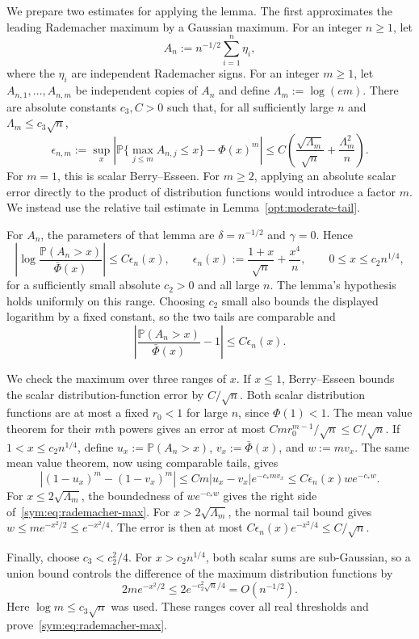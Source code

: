 \documentclass[11pt,letterpaper,twoside,leqno]{article}
\theoremstyle{bookplain}
\theoremstyle{bookremark}
\newcommand{\Pp}{\mathbb P}
\begin{document}
We prepare two estimates for applying the lemma. The first
approximates the leading Rademacher maximum by a Gaussian maximum.
For an integer $n\ge1$, let
\[
 A_n:=n^{-1/2}\sum_{i=1}^n\eta_i,
\]
where the $\eta_i$ are independent Rademacher signs. For an integer
$m\ge1$, let $A_{n,1},\ldots,A_{n,m}$ be independent copies
of $A_n$ and define $\Lambda_m:=\log(em)$. There are absolute
constants $c_3,C>0$ such that, for all sufficiently large $n$
and $\Lambda_m\le c_3\sqrt n$,
\begin{equation}
 \epsilon_{n,m}:=\sup_x\left|\Pp\{\max_{j\le m}A_{n,j}\le x\}
                         -\Phi(x)^m\right|
 \le C\left(\frac{\sqrt{\Lambda_m}}{\sqrt n}
                 +\frac{\Lambda_m^2}{n}\right).
 \label{sym:eq:rademacher-max}
\end{equation}
For $m=1$, this is scalar Berry--Esseen. For $m\ge2$, applying
an absolute scalar error directly to the product of distribution
functions would introduce a factor $m$. We instead use the
relative tail estimate in Lemma~\ref{opt:moderate-tail}.

For $A_n$, the parameters of that lemma are $\delta=n^{-1/2}$
and $\gamma=0$. Hence
\[
 \left|\log\frac{\Pp(A_n>x)}{\bar\Phi(x)}\right|
 \le C\epsilon_n(x),\qquad
 \epsilon_n(x):=\frac{1+x}{\sqrt n}+\frac{x^4}{n},
 \qquad 0\le x\le c_2n^{1/4},
\]
for a sufficiently small absolute $c_2>0$ and all large $n$.
The lemma's hypothesis holds uniformly on this range. Choosing
$c_2$ small also bounds the displayed logarithm by a fixed
constant, so the two tails are comparable and
\[
 \left|\frac{\Pp(A_n>x)}{\bar\Phi(x)}-1\right|
 \le C\epsilon_n(x).
\]

We check the maximum over three ranges of $x$. If $x\le1$,
Berry--Esseen bounds the scalar distribution-function error by
$C/\sqrt n$. Both scalar distribution functions are at most a
fixed $r_0<1$ for large $n$, since $\Phi(1)<1$.
The mean value theorem for their $m$th powers gives an error at
most $Cm r_0^{m-1}/\sqrt n\le C/\sqrt n$.
If $1<x\le c_2n^{1/4}$, define
$u_x:=\Pp(A_n>x)$, $v_x:=\bar\Phi(x)$, and $w:=mv_x$.
The same mean value theorem, now using comparable tails, gives
\[
 |(1-u_x)^m-(1-v_x)^m|
 \le Cm|u_x-v_x|e^{-c_*mv_x}
 \le C\epsilon_n(x)w e^{-c_*w}.
\]
For $x\le2\sqrt{\Lambda_m}$, the boundedness of
$we^{-c_*w}$ gives the right side of~\eqref{sym:eq:rademacher-max}.
For $x>2\sqrt{\Lambda_m}$, the normal tail bound gives
$w\le me^{-x^2/2}\le e^{-x^2/4}$. The error is then at most
$C\epsilon_n(x)e^{-x^2/4}\le C/\sqrt n$.

Finally, choose $c_3<c_2^2/4$. For $x>c_2n^{1/4}$, both
scalar sums are sub-Gaussian, so a union bound controls the
difference of the maximum distribution functions by
\[
 2me^{-x^2/2}\le2e^{-c_2^2\sqrt n/4}=O(n^{-1/2}).
\]
Here $\log m\le c_3\sqrt n$ was used. These ranges cover all
real thresholds and prove~\eqref{sym:eq:rademacher-max}.
\end{document}
